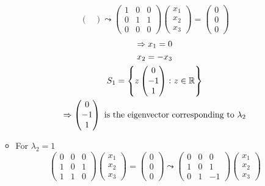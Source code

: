 \begin{enumerate}
\begin{itemize}
\begin{equation}
\begin{pmatrix}
\end{pmatrix}
\leadsto
\begin{pmatrix}
1 & 0 & 0\\
0 & 1 & 1\\
0 & 0 & 0
\end{pmatrix}
\begin{pmatrix}
x_1\\x_2\\x_3
\end{pmatrix}
=
\begin{pmatrix}
0\\0\\0
\end{pmatrix}
\end{equation}
\begin{gather}
\implies x_1 = 0\\
x_2 = -x_3\\
S_1 = \left\{z\begin{pmatrix}0\\-1\\1\end{pmatrix} \colon z \in
  \mathbb{R}\right \}\\
\notag \implies \begin{pmatrix}0\\-1\\1\end{pmatrix} \text{ is the
  eigenvector corresponding to } \lambda_2
\end{gather}
\item For $\lambda_2 = 1$
\begin{equation}
\begin{pmatrix}
0 & 0 & 0\\
1 & 0 & 1\\
1 & 1 & 0
\end{pmatrix}
\begin{pmatrix}
x_1\\x_2\\x_3
\end{pmatrix}
=
\begin{pmatrix}
0\\0\\0
\end{pmatrix}
\leadsto
\begin{pmatrix}
0 & 0 & 0\\
1 & 0 & 1\\
0 & 1 & -1
\end{pmatrix}
\begin{pmatrix}
x_1\\x_2\\x_3

\end{pmatrix}
\end{equation}
\end{itemize}
\end{enumerate}
